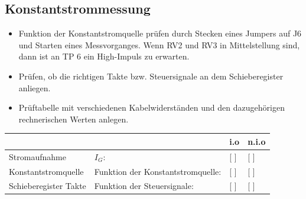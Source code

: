 
\newpage
\subsection{Konstantstrommessung}


\begin{itemize}
	\item{Funktion der Konstantstromquelle prüfen durch Stecken eines Jumpers auf J6 und Starten eines Messvorganges. Wenn RV2 und RV3 in Mittelstellung sind, dann ist an TP 6 ein High-Impuls zu erwarten.}
	
	\item{Prüfen, ob die richtigen Takte bzw. Steuersignale an dem Schieberegister anliegen.}
	
	\item{Prüftabelle mit verschiedenen Kabelwiderständen und den dazugehörigen rechnerischen Werten anlegen.}
\end{itemize}


\renewcommand{\arraystretch}{2}
\begin{tabularx}{\textwidth}{p{}| p{} | p{} | p{}}

 &  & i.o & n.i.o \\

\hline

Stromaufnahme & $I_{G}$: & [ ] & [ ] \\

\hline

Konstantstromquelle & Funktion der Konstantstromquelle: 	& [ ] & [ ] \\

\hline

Schieberegister Takte & Funktion der Steuersignale: 		& [ ] & [ ] \\
		
\end{tabularx}
\renewcommand{\arraystretch}{1}

